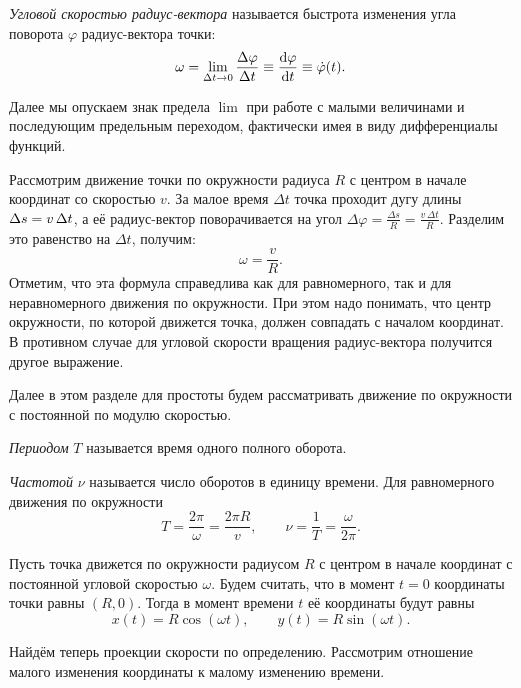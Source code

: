 \documentclass[../main.tex]{subfiles}
\begin{document}
\begin{definition}
\textit{Угловой скоростью радиус-вектора} называется быстрота изменения
угла поворота $\varphi$ радиус-вектора точки:
\[
\omega = \lim_{\Delta t \to 0}\frac{\Delta\varphi}{\Delta t}\equiv\dv{\varphi}{t} \equiv \dot{\varphi}(t).
\]
\end{definition}

Далее мы опускаем знак предела $\lim$ при работе с малыми величинами и последующим предельным переходом, фактически имея в виду дифференциалы функций. 

Рассмотрим движение точки по окружности радиуса $R$ с центром в начале координат со скоростью $v$. За малое время $\Delta t$ точка проходит дугу длины
$\Delta s \hm = v\,\Delta t$, а её радиус-вектор поворачивается на угол  $\Delta\varphi = \frac{\Delta s}{R} = \frac{v\,\Delta t}{R}$. Разделим это равенство на $\Delta t$, получим:
\[
\omega = \frac{v}{R}.
\]
Отметим, что эта формула справедлива как для равномерного, так и для неравномерного движения по окружности. При этом надо понимать, что центр окружности, по которой движется точка, должен совпадать с началом координат. В противном случае для угловой скорости вращения радиус-вектора получится другое выражение.

Далее в этом разделе для простоты будем рассматривать движение по окружности с постоянной по модулю скоростью.

\begin{definition}
\textit{Периодом} $T$ называется время одного полного оборота.

\textit{Частотой} $\nu$ называется число оборотов в единицу времени.
Для равномерного движения по окружности
\[
T = \frac{2\pi}{\omega} = \frac{2\pi R}{v},
\qquad
\nu = \frac{1}{T} = \frac{\omega}{2\pi}.
\]
\end{definition}

Пусть точка движется по окружности радиусом $R$ с центром в начале координат с постоянной угловой скоростью $\omega$. Будем считать, что в момент $t = 0$ координаты точки равны $(R, 0)$. Тогда в момент времени $t$ её координаты будут равны
\[
x(t) = R\cos(\omega t), \qquad y(t) = R\sin(\omega t).
\]

Найдём теперь проекции скорости по определению. Рассмотрим отношение малого изменения координаты к малому изменению времени. 
\end{document}
